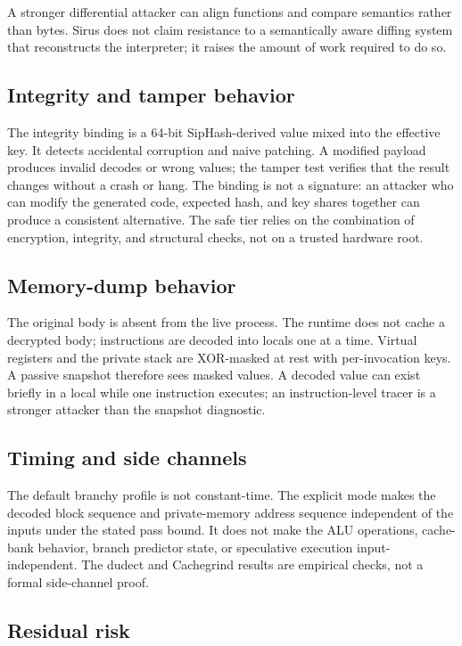 A stronger differential attacker can align functions and compare semantics
rather than bytes. Sirus does not claim resistance to a semantically aware
diffing system that reconstructs the interpreter; it raises the amount of work
required to do so.

\subsection{Integrity and tamper behavior}

The integrity binding is a 64-bit SipHash-derived value mixed into the effective
key. It detects accidental corruption and naive patching. A modified payload
produces invalid decodes or wrong values; the tamper test verifies that the
result changes without a crash or hang. The binding is not a signature: an
attacker who can modify the generated code, expected hash, and key shares
together can produce a consistent alternative. The safe tier relies on the
combination of encryption, integrity, and structural checks, not on a trusted
hardware root.

\subsection{Memory-dump behavior}

The original body is absent from the live process. The runtime does not cache a
decrypted body; instructions are decoded into locals one at a time. Virtual
registers and the private stack are XOR-masked at rest with per-invocation keys.
A passive snapshot therefore sees masked values. A decoded value can exist
briefly in a local while one instruction executes; an instruction-level tracer
is a stronger attacker than the snapshot diagnostic.

\subsection{Timing and side channels}

The default branchy profile is not constant-time. The explicit mode makes the
decoded block sequence and private-memory address sequence independent of the
inputs under the stated pass bound. It does not make the ALU operations,
cache-bank behavior, branch predictor state, or speculative execution
input-independent. The dudect and Cachegrind results are empirical checks, not a
formal side-channel proof.

\subsection{Residual risk}

